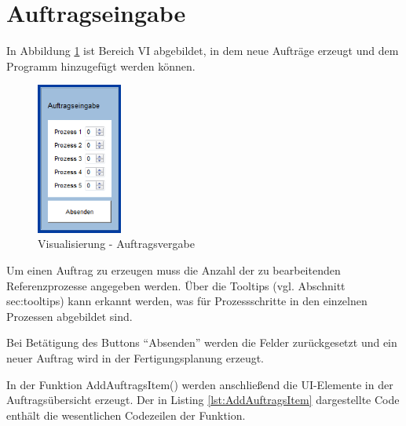 \section{Auftragseingabe}
\label{sec:Auftragseingabe}

In Abbildung \ref{fig:Auftragsvergabe} ist Bereich VI abgebildet, in dem neue Aufträge erzeugt und dem Programm hinzugefügt werden können. 

\begin{figure}[htb]
    \centering
    \includegraphics[width=0.25\textwidth]{Abbildungen/Auftragsvergabe.png}
    \caption{Visualisierung - Auftragsvergabe}		
    \label{fig:Auftragsvergabe}
\end{figure}

Um einen Auftrag zu erzeugen muss die Anzahl der zu bearbeitenden Referenzprozesse angegeben werden. Über die Tooltips (vgl. Abschnitt {sec:tooltips}) kann erkannt werden, was für Prozessschritte in den einzelnen Prozessen abgebildet sind. 

Bei Betätigung des Buttons "`Absenden"' werden die Felder zurückgesetzt und ein neuer Auftrag wird in der Fertigungsplanung erzeugt. 

In der Funktion AddAuftragsItem() werden anschließend die UI-Elemente in der Auftragsübersicht erzeugt. Der in Listing \ref{lst:AddAuftragsItem} dargestellte Code enthält die wesentlichen Codezeilen der Funktion. 

